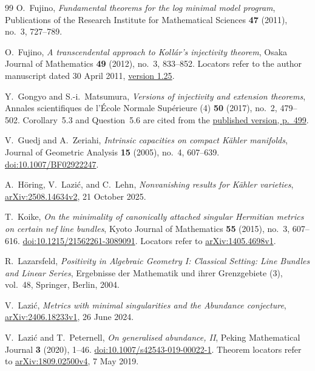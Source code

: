 \begin{thebibliography}{99}
O.~Fujino,
\emph{Fundamental theorems for the log minimal model program},
Publications of the Research Institute for Mathematical Sciences
\textbf{47} (2011), no.~3, 727--789.

O.~Fujino,
\emph{A transcendental approach to Koll\'ar's injectivity theorem},
Osaka Journal of Mathematics \textbf{49} (2012), no.~3, 833--852.
Locators refer to the author manuscript dated 30 April 2011,
\href{https://www.math.kyoto-u.ac.jp/~fujino/kollar1-03.pdf}{version 1.25}.

Y.~Gongyo and S.-i.~Matsumura,
\emph{Versions of injectivity and extension theorems},
Annales scientifiques de l'\'Ecole Normale Sup\'erieure (4)
\textbf{50} (2017), no.~2, 479--502.
Corollary~5.3 and Question~5.6 are cited from the
\href{https://numdam.org/item/10.24033/asens.2325.pdf}{published version, p.~499}.

V.~Guedj and A.~Zeriahi,
\emph{Intrinsic capacities on compact K\"ahler manifolds},
Journal of Geometric Analysis \textbf{15} (2005), no.~4, 607--639.
\href{https://doi.org/10.1007/BF02922247}{doi:10.1007/BF02922247}.

A.~H\"oring, V.~Lazi\'c, and C.~Lehn,
\emph{Nonvanishing results for K\"ahler varieties},
\href{https://arxiv.org/abs/2508.14634v2}{arXiv:2508.14634v2},
21 October 2025.

T.~Koike,
\emph{On the minimality of canonically attached singular Hermitian metrics on certain nef line bundles},
Kyoto Journal of Mathematics \textbf{55} (2015), no.~3, 607--616.
\href{https://doi.org/10.1215/21562261-3089091}{doi:10.1215/21562261-3089091}.
Locators refer to \href{https://arxiv.org/abs/1405.4698v1}{arXiv:1405.4698v1}.

R.~Lazarsfeld,
\emph{Positivity in Algebraic Geometry I: Classical Setting: Line Bundles and Linear Series},
Ergebnisse der Mathematik und ihrer Grenzgebiete (3), vol.~48,
Springer, Berlin, 2004.

V.~Lazi\'c,
\emph{Metrics with minimal singularities and the Abundance conjecture},
\href{https://arxiv.org/abs/2406.18233v1}{arXiv:2406.18233v1},
26 June 2024.

V.~Lazi\'c and T.~Peternell,
\emph{On generalised abundance, II},
Peking Mathematical Journal \textbf{3} (2020), 1--46.
\href{https://doi.org/10.1007/s42543-019-00022-1}{doi:10.1007/s42543-019-00022-1}.
Theorem locators refer to \href{https://arxiv.org/abs/1809.02500v4}{arXiv:1809.02500v4},
7 May 2019.


\end{thebibliography}
